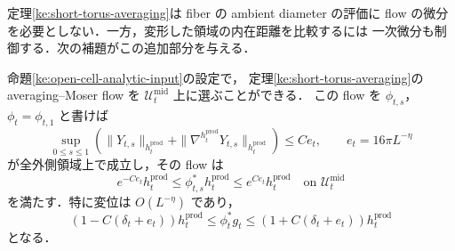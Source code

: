 定理\ref{ke:short-torus-averaging}は fiber の ambient diameter の評価に
flow の微分を必要としない．一方，変形した領域の内在距離を比較するには
一次微分も制御する．次の補題がこの追加部分を与える．

\begin{lemma}
\label{ke:open-cell-moser-c1}
命題\ref{ke:open-cell-analytic-input}の設定で，
定理\ref{ke:short-torus-averaging}の averaging--Moser flow を
$\mathcal U_t^{\mathrm{mid}}$ 上に選ぶことができる．
この flow を $\phi_{t,s}$，$\phi_t=\phi_{t,1}$ と書けば
\begin{equation}\label{ke:eq:open-moser-c1}
 \sup_{0\le s\le1}
 \left(\|Y_{t,s}\|_{h_t^{\mathrm{prod}}}
       +\|\nabla^{h_t^{\mathrm{prod}}}Y_{t,s}\|_{h_t^{\mathrm{prod}}}\right)
 \le C e_t,
 \qquad e_t=16\pi L^{-\eta}
\end{equation}
が全外側領域上で成立し，その flow は
\begin{equation}\label{ke:eq:open-flow-metric}
 e^{-Ce_t}h_t^{\mathrm{prod}}
 \le\phi_{t,s}^*h_t^{\mathrm{prod}}
 \le e^{Ce_t}h_t^{\mathrm{prod}}
 \quad\text{on }\mathcal U_t^{\mathrm{mid}}
\end{equation}
を満たす．特に変位は $O(L^{-\eta})$ であり，
\begin{equation}\label{ke:eq:open-pullback-metric}
 (1-C(\delta_t+e_t))h_t^{\mathrm{prod}}
 \le\phi_t^*g_t
 \le(1+C(\delta_t+e_t))h_t^{\mathrm{prod}}
\end{equation}
となる．
\end{lemma}
